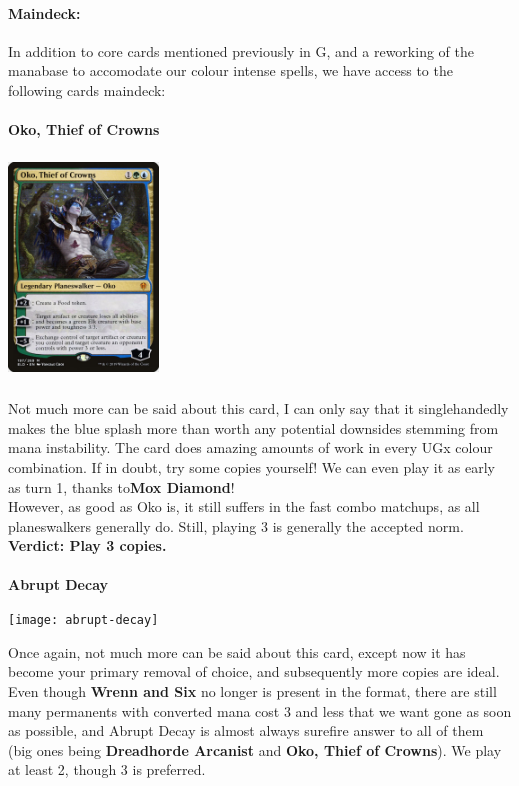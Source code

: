\documentclass{report}
\begin{document}
\paragraph{Maindeck:}
In addition to core cards mentioned previously in G, and a reworking of the manabase to accomodate our colour intense spells, we have access to the following cards maindeck:\\\\
\textbf{Oko, Thief of Crowns\\}
\begin{center}
\includegraphics [width = 4cm, height = 6cm] {oko-thief-of-crowns}
\end{center}
Not much more can be said about this card, I can only say that it singlehandedly makes the blue splash more than worth any potential downsides stemming from mana instability. The card does amazing amounts of work in every UGx colour combination. If in doubt, try some copies yourself! We can even play it as early as turn 1, thanks to\textbf{Mox Diamond}!\\
However, as good as Oko is, it still suffers in the fast combo matchups, as all planeswalkers generally do. Still, playing 3 is generally the accepted norm.\\
\textbf{Verdict: Play 3 copies.\\\\}
\textbf{Abrupt Decay\\}
\begin{center}
\texttt{[image: abrupt-decay]}
\end{center}
Once again, not much more can be said about this card, except now it has become your primary removal of choice, and subsequently more copies are ideal. Even though \textbf{Wrenn and Six} no longer is present in the format, there are still many permanents with converted mana cost 3 and less that we want gone as soon as possible, and Abrupt Decay is almost always surefire answer to all of them (big ones being \textbf{Dreadhorde Arcanist} and \textbf{Oko, Thief of Crowns}). We play at least 2, though 3 is preferred.\\
\end{document}
